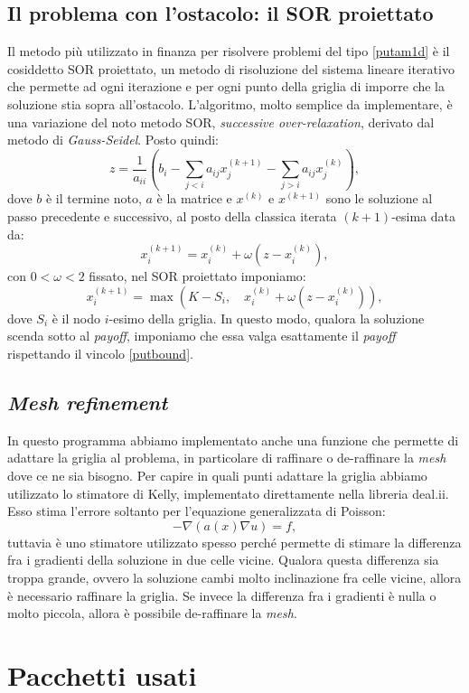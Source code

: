 \documentclass[a4paper,10pt]{report}
\theoremstyle{plain}
\theoremstyle{definition}
\theoremstyle{remark}
\begin{document}
\section{Il problema con l'ostacolo: il SOR proiettato}
Il metodo pi\`u utilizzato in finanza per risolvere problemi del tipo \eqref{putam1d}  \`e il cosiddetto SOR proiettato, un metodo di risoluzione del sistema lineare iterativo che permette ad ogni iterazione e per ogni punto della griglia di imporre che la soluzione stia sopra all'ostacolo. L'algoritmo, molto semplice da implementare, \`e una variazione del noto metodo SOR, \emph{successive over-relaxation}, derivato dal metodo di \emph{Gauss-Seidel}. Posto quindi: $$z=\frac{1}{a_{ii}}\left(b_i-\sum_{j<i}a_{ij}x_j^{(k+1)}-\sum_{j>i}a_{ij}x_j^{(k)}\right),$$dove $b$ \`e il termine noto, $a$ \`e la matrice e $x^{(k)}$ e $x^{(k+1)}$ sono le soluzione al passo precedente e successivo, al posto della classica iterata $(k+1)$-esima data da: $$x_i^{(k+1)}=x_i^{(k)}+\omega(z-x_i^{(k)}),$$con $0<\omega<2$ fissato, nel SOR proiettato imponiamo: $$x_i^{(k+1)}=\max\left(K-S_i,\quad x_i^{(k)}+\omega(z-x_i^{(k)})\right),$$dove $S_i$ \`e il nodo $i$-esimo della griglia. In questo modo, qualora la soluzione scenda sotto al \emph{payoff}, imponiamo che essa valga esattamente il \emph{payoff} rispettando il vincolo \eqref{putbound}.
\section{\emph{Mesh refinement}}
In questo programma abbiamo implementato anche una funzione che permette di adattare la griglia al problema, in particolare di raffinare o de-raffinare la \emph{mesh} dove ce ne sia bisogno. Per capire in quali punti adattare la griglia abbiamo utilizzato lo stimatore di Kelly, implementato direttamente nella libreria \textsf{deal.ii}. Esso stima l'errore soltanto per l'equazione generalizzata di Poisson: $$-\nabla\left(a(x)\nabla u\right)=f,$$tuttavia \`e uno stimatore utilizzato spesso perch\'e permette di stimare la differenza fra i gradienti della soluzione in due celle vicine. Qualora questa differenza sia troppa grande, ovvero la soluzione cambi molto inclinazione fra celle vicine, allora \`e necessario raffinare la griglia. Se invece la differenza fra i gradienti \`e nulla o molto piccola, allora \`e possibile de-raffinare la \emph{mesh}.
\chapter{Pacchetti usati}
\end{document}
